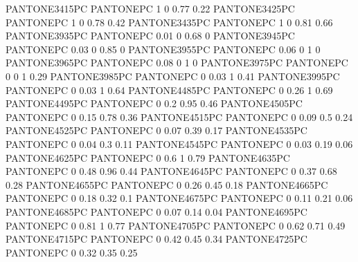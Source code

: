  {PANTONE3415PC} {PANTONE\SpotSpace PC} {1 0 0.77 0.22}
 {PANTONE3425PC} {PANTONE\SpotSpace PC} {1 0 0.78 0.42}
 {PANTONE3435PC} {PANTONE\SpotSpace PC} {1 0 0.81 0.66}
 {PANTONE3935PC} {PANTONE\SpotSpace PC} {0.01 0 0.68 0}
 {PANTONE3945PC} {PANTONE\SpotSpace PC} {0.03 0 0.85 0}
 {PANTONE3955PC} {PANTONE\SpotSpace PC} {0.06 0 1 0}
 {PANTONE3965PC} {PANTONE\SpotSpace PC} {0.08 0 1 0}
 {PANTONE3975PC} {PANTONE\SpotSpace PC} {0 0 1 0.29}
 {PANTONE3985PC} {PANTONE\SpotSpace PC} {0 0.03 1 0.41}
 {PANTONE3995PC} {PANTONE\SpotSpace PC} {0 0.03 1 0.64}
 {PANTONE4485PC} {PANTONE\SpotSpace PC} {0 0.26 1 0.69}
 {PANTONE4495PC} {PANTONE\SpotSpace PC} {0 0.2 0.95 0.46}
 {PANTONE4505PC} {PANTONE\SpotSpace PC} {0 0.15 0.78 0.36}
 {PANTONE4515PC} {PANTONE\SpotSpace PC} {0 0.09 0.5 0.24}
 {PANTONE4525PC} {PANTONE\SpotSpace PC} {0 0.07 0.39 0.17}
 {PANTONE4535PC} {PANTONE\SpotSpace PC} {0 0.04 0.3 0.11}
 {PANTONE4545PC} {PANTONE\SpotSpace PC} {0 0.03 0.19 0.06}
 {PANTONE4625PC} {PANTONE\SpotSpace PC} {0 0.6 1 0.79}
 {PANTONE4635PC} {PANTONE\SpotSpace PC} {0 0.48 0.96 0.44}
 {PANTONE4645PC} {PANTONE\SpotSpace PC} {0 0.37 0.68 0.28}
 {PANTONE4655PC} {PANTONE\SpotSpace PC} {0 0.26 0.45 0.18}
 {PANTONE4665PC} {PANTONE\SpotSpace PC} {0 0.18 0.32 0.1}
 {PANTONE4675PC} {PANTONE\SpotSpace PC} {0 0.11 0.21 0.06}
 {PANTONE4685PC} {PANTONE\SpotSpace PC} {0 0.07 0.14 0.04}
 {PANTONE4695PC} {PANTONE\SpotSpace PC} {0 0.81 1 0.77}
 {PANTONE4705PC} {PANTONE\SpotSpace PC} {0 0.62 0.71 0.49}
 {PANTONE4715PC} {PANTONE\SpotSpace PC} {0 0.42 0.45 0.34}
 {PANTONE4725PC} {PANTONE\SpotSpace PC} {0 0.32 0.35 0.25}
